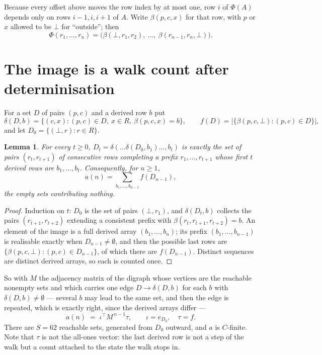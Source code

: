 \documentclass[11pt,a4paper]{article}
\theoremstyle{plain}
\newtheorem{lemma}[theorem]{Lemma}
\theoremstyle{definition}
\begin{document}
Because every offset above moves the row index by at most one, row $i$ of
$\Phi(A)$ depends only on rows $i-1,i,i+1$ of $A$. Write $\beta(p,c,x)$ for that row, with $p$
or $x$ allowed to be $\bot$ for ``outside''; then
\[
\Phi(r_1,\dots,r_n)=\bigl(\beta(\bot,r_1,r_2),\ \dots,\ \beta(r_{n-1},r_n,\bot)\bigr).
\]

\section{The image is a walk count after determinisation}

For a set $D$ of pairs $(p,c)$ and a derived row $b$ put
\[
\delta(D,b)=\{(c,x):(p,c)\in D,\ x\in R,\ \beta(p,c,x)=b\},\qquad
f(D)=\bigl|\{\beta(p,c,\bot):(p,c)\in D\}\bigr| ,
\]
and let $D_0=\{(\bot,r):r\in R\}$.

\begin{lemma}\label{lem:det}
For every $t\ge0$, $D_t=\delta(\dots\delta(D_0,b_1)\dots,b_t)$ is exactly the set of pairs
$(r_t,r_{t+1})$ of consecutive rows completing a prefix $r_1,\dots,r_{t+1}$ whose first $t$
derived rows are $b_1,\dots,b_t$. Consequently, for $n\ge1$,
\[
a(n)=\sum_{b_1,\dots,b_{n-1}}f(D_{n-1}),
\]
the empty sets contributing nothing.
\end{lemma}

\begin{proof}
Induction on $t$: $D_0$ is the set of pairs $(\bot,r_1)$, and $\delta(D_t,b)$ collects the
pairs $(r_{t+1},r_{t+2})$ extending a consistent prefix with
$\beta(r_t,r_{t+1},r_{t+2})=b$. An element of the image is a full derived array
$(b_1,\dots,b_n)$; its prefix $(b_1,\dots,b_{n-1})$ is realisable exactly when
$D_{n-1}\neq\emptyset$, and then the possible last rows are
$\{\beta(p,c,\bot):(p,c)\in D_{n-1}\}$, of which there are $f(D_{n-1})$. Distinct sequences
are distinct derived arrays, so each is counted once.
\end{proof}

So with $M$ the adjacency matrix of the digraph whose vertices are the reachable nonempty sets
and which carries one edge $D\to\delta(D,b)$ for each $b$ with $\delta(D,b)\neq\emptyset$ ---
several $b$ may lead to the same set, and then the edge is repeated, which is exactly right,
since the derived arrays differ ---
\[
a(n)\;=\;\iota^{\!\top}M^{\,n-1}\tau,\qquad \iota=e_{D_0},\quad \tau=f .
\]
There are $S=62$ reachable sets, generated from $D_0$ outward, and $a$ is $C$-finite.
Note that $\tau$ is not the all-ones vector: the last derived row is not a
step of the walk but a count attached to the state the walk stops in.
\end{document}
